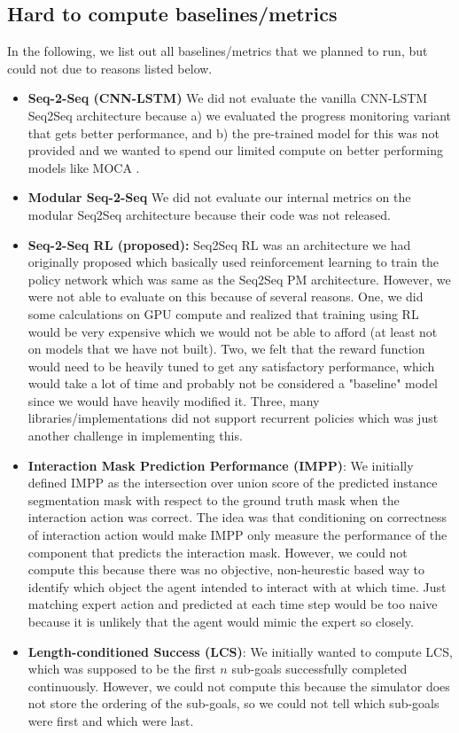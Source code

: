 \documentclass[11pt,a4paper]{article}
\begin{document}
\subsection{Hard to compute baselines/metrics}
\label{app:missed}
In the following, we list out all baselines/metrics that we planned to run, but could not due to reasons listed below.

\begin{itemize}
    \item \textbf{Seq-2-Seq (CNN-LSTM)} \cite{shridhar2020alfred} We did not evaluate the vanilla CNN-LSTM Seq2Seq architecture because a) we evaluated the progress monitoring variant that gets better performance, and b) the pre-trained model for this was not provided and we wanted to spend our limited compute on better performing models like MOCA \cite{singh2020moca}.
    \item \textbf{Modular Seq-2-Seq} \cite{corona2020modularity} We did not evaluate our internal metrics on the modular Seq2Seq architecture because their code was not released.
    \item \textbf{Seq-2-Seq RL (proposed):} Seq2Seq RL was an architecture we had originally proposed which basically used reinforcement learning to train the policy network which was same as the Seq2Seq PM architecture. However, we were not able to evaluate on this because of several reasons. One, we did some calculations on GPU compute and realized that training using RL would be very expensive which we would not be able to afford (at least not on models that we have not built). Two, we felt that the reward function would need to be heavily tuned to get any satisfactory performance, which would take a lot of time and probably not be considered a "baseline" model since we would have heavily modified it. Three, many libraries/implementations did not support recurrent policies which was just another challenge in implementing this.
    \item \textbf{Interaction Mask Prediction Performance (IMPP)}: We initially defined IMPP as the intersection over union score of the predicted instance segmentation mask with respect to the ground truth mask when the interaction action was correct. The idea was that conditioning on correctness of interaction action would make IMPP only measure the performance of the component that predicts the interaction mask. However, we could not compute this because there was no objective, non-heurestic based way to identify which object the agent intended to interact with at which time. Just matching expert action and predicted at each time step would be too naive because it is unlikely that the agent would mimic the expert so closely.
    \item \textbf{Length-conditioned Success (LCS)}: We initially wanted to compute LCS, which was supposed to be the first $n$ sub-goals successfully completed continuously. However, we could not compute this because the simulator does not store the ordering of the sub-goals, so we could not tell which sub-goals were first and which were last.
\end{itemize}
\end{document}

